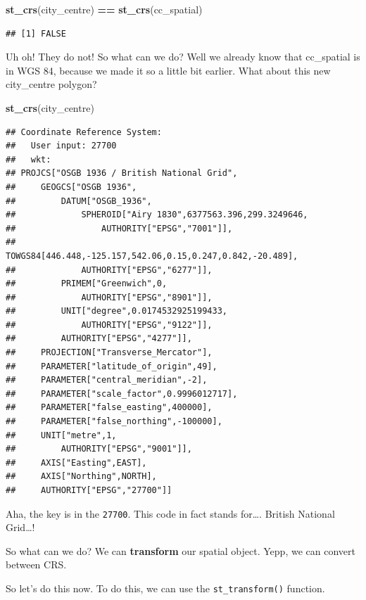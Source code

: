 \documentclass[]{book}
\newenvironment{Shaded}{\begin{snugshade}}{\end{snugshade}}
\newcommand{\KeywordTok}[1]{\textcolor[rgb]{0.13,0.29,0.53}{\textbf{#1}}}
\newcommand{\NormalTok}[1]{#1}
\newcommand{\OperatorTok}[1]{\textcolor[rgb]{0.81,0.36,0.00}{\textbf{#1}}}
\newcommand{\StringTok}[1]{\textcolor[rgb]{0.31,0.60,0.02}{#1}}
\begin{document}
\begin{Shaded}
\begin{Highlighting}[]
\KeywordTok{st_crs}\NormalTok{(city_centre) }\OperatorTok{==}\StringTok{ }\KeywordTok{st_crs}\NormalTok{(cc_spatial)}
\end{Highlighting}
\end{Shaded}

\begin{verbatim}
## [1] FALSE
\end{verbatim}

Uh oh! They do not! So what can we do? Well we already know that cc\_spatial is in WGS 84, because we made it so a little bit earlier. What about this new city\_centre polygon?

\begin{Shaded}
\begin{Highlighting}[]
\KeywordTok{st_crs}\NormalTok{(city_centre) }
\end{Highlighting}
\end{Shaded}

\begin{verbatim}
## Coordinate Reference System:
##   User input: 27700 
##   wkt:
## PROJCS["OSGB 1936 / British National Grid",
##     GEOGCS["OSGB 1936",
##         DATUM["OSGB_1936",
##             SPHEROID["Airy 1830",6377563.396,299.3249646,
##                 AUTHORITY["EPSG","7001"]],
##             TOWGS84[446.448,-125.157,542.06,0.15,0.247,0.842,-20.489],
##             AUTHORITY["EPSG","6277"]],
##         PRIMEM["Greenwich",0,
##             AUTHORITY["EPSG","8901"]],
##         UNIT["degree",0.0174532925199433,
##             AUTHORITY["EPSG","9122"]],
##         AUTHORITY["EPSG","4277"]],
##     PROJECTION["Transverse_Mercator"],
##     PARAMETER["latitude_of_origin",49],
##     PARAMETER["central_meridian",-2],
##     PARAMETER["scale_factor",0.9996012717],
##     PARAMETER["false_easting",400000],
##     PARAMETER["false_northing",-100000],
##     UNIT["metre",1,
##         AUTHORITY["EPSG","9001"]],
##     AXIS["Easting",EAST],
##     AXIS["Northing",NORTH],
##     AUTHORITY["EPSG","27700"]]
\end{verbatim}

Aha, the key is in the \texttt{27700}. This code in fact stands for\ldots{}. British National Grid\ldots{}!

So what can we do? We can \textbf{transform} our spatial object. Yepp, we can convert between CRS.

So let's do this now. To do this, we can use the \texttt{st\_transform()} function.
\end{document}
